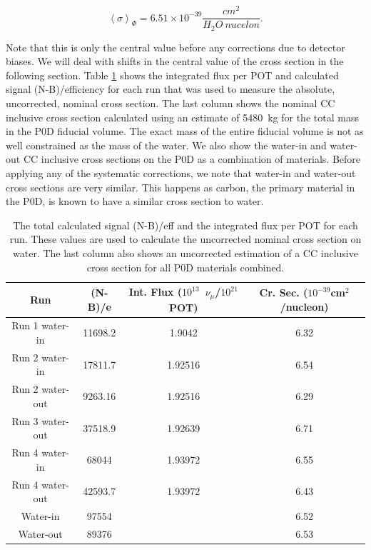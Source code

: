 \begin{equation}
\left<\sigma\right>_\Phi = 6.51 \times 10^{-39} \frac{cm^2}{H_2O\:nucelon}.
\end{equation}

Note that this is only the central value before any corrections due to detector biases. We will deal with shifts in the central value of the cross section in the following section. Table \ref{tab:xscalc} shows the integrated flux per POT and calculated signal (N-B)/efficiency for each run that was used to measure the absolute, uncorrected, nominal cross section. The last column shows the nominal CC inclusive cross section calculated using an estimate of 5480~kg for the total mass in the P0D fiducial volume. The exact mass of the entire fiducial volume is not as well constrained as the mass of the water. We also show the water-in and water-out CC inclusive cross sections on the P0D as a combination of materials. Before applying any of the systematic corrections, we note that water-in and water-out cross sections are very similar. This happens as carbon, the primary material in the P0D, is known to have a similar cross section to water.

\begin{table}[h]
\caption{The total calculated signal (N-B)/eff and the integrated flux per POT for each run. These values are used to calculate the uncorrected nominal cross section on water. The last column also shows an uncorrected estimation of a CC inclusive cross section for all P0D materials combined.}
\centering
\begin{tabular}{cccc} \toprule
Run & (N-B)/e & Int. Flux ($10^{13}$~$\nu_\mu$/$10^{21}$ POT) & Cr. Sec. ($10^{-39}$cm$^2$/nucleon)\\
\hline
Run 1 water-in & 11698.2 & 1.9042 & 6.32\\ 
Run 2 water-in & 17811.7 & 1.92516 & 6.54\\ 
Run 2 water-out & 9263.16 & 1.92516 & 6.29\\ 
Run 3 water-out & 37518.9 & 1.92639 & 6.71\\ 
Run 4 water-in & 68044 & 1.93972 & 6.55\\ 
Run 4 water-out & 42593.7 & 1.93972 & 6.43\\ 
\hline
Water-in & 97554 & & 6.52\\
Water-out & 89376 & & 6.53\\
\hline
\bottomrule
\end{tabular} 
\label{tab:xscalc}
\end{table}